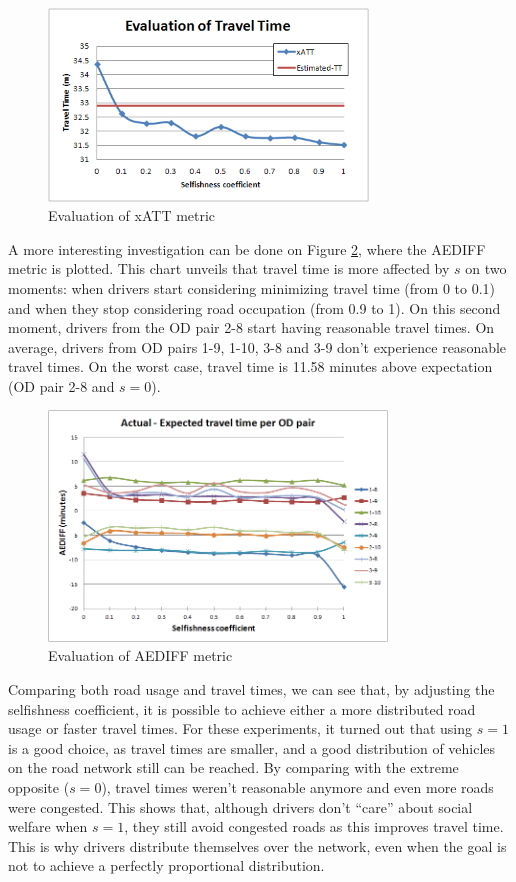 \documentclass[12pt]{article}
\begin{document}
\begin{figure}[ht]
    \centerline{\includegraphics[width=8.5cm]{img/globalTravelTime.png}}
    \caption{Evaluation of xATT metric}
    \label{fig:globalTravelTime}
\end{figure}

A more interesting investigation can be done on Figure \ref{fig:travelTimePerOD}, where the AEDIFF metric is plotted. This chart unveils that travel time is more affected by $s$ on two moments: when drivers start considering minimizing travel time (from 0 to 0.1) and when they stop considering road occupation (from 0.9 to 1). On this second moment, drivers from the OD pair 2-8 start having reasonable travel times. On average, drivers from OD pairs 1-9, 1-10, 3-8 and 3-9 don't experience reasonable travel times. On the worst case, travel time is 11.58 minutes above expectation (OD pair 2-8 and $s=0$).

\begin{figure}[ht]
    \centerline{\includegraphics[width=9cm]{img/travelTimePerOD.png}}
    \caption{Evaluation of AEDIFF metric}
    \label{fig:travelTimePerOD}
\end{figure}

Comparing both road usage and travel times, we can see that, by adjusting the selfishness coefficient, it is possible to achieve either a more distributed road usage or faster travel times. For these experiments, it turned out that using $s=1$ is a good choice, as travel times are smaller, and a good distribution of vehicles on the road network still can be reached. By comparing with the extreme opposite ($s = 0$), travel times weren't reasonable anymore and even more roads were congested. This shows that, although drivers don't ``care'' about social welfare when $s=1$, they still avoid congested roads as this improves travel time. This is why drivers distribute themselves over the network, even when the goal is not to achieve a perfectly proportional distribution.
\end{document}
